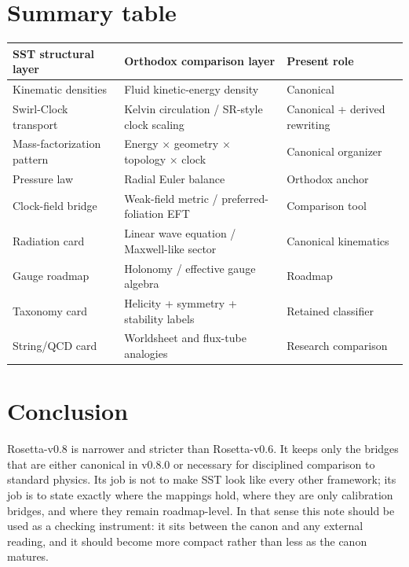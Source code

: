 \documentclass[11pt,a4paper]{article}
\begin{document}
\section{Summary table}
\begin{center}
\begin{tabular}{@{}lll@{}}
\toprule
SST structural layer & Orthodox comparison layer & Present role \\
\midrule
Kinematic densities & Fluid kinetic-energy density & Canonical \\
Swirl-Clock transport & Kelvin circulation / SR-style clock scaling & Canonical + derived rewriting \\
Mass-factorization pattern & Energy \(\times\) geometry \(\times\) topology \(\times\) clock & Canonical organizer \\
Pressure law & Radial Euler balance & Orthodox anchor \\
Clock-field bridge & Weak-field metric / preferred-foliation EFT & Comparison tool \\
Radiation card & Linear wave equation / Maxwell-like sector & Canonical kinematics \\
Gauge roadmap & Holonomy / effective gauge algebra & Roadmap \\
Taxonomy card & Helicity + symmetry + stability labels & Retained classifier \\
String/QCD card & Worldsheet and flux-tube analogies & Research comparison \\
\bottomrule
\end{tabular}
\end{center}

\section*{Conclusion}
Rosetta-v0.8 is narrower and stricter than Rosetta-v0.6. It keeps only the bridges that are either canonical in v0.8.0 or necessary for disciplined comparison to standard physics. Its job is not to make SST look like every other framework; its job is to state exactly where the mappings hold, where they are only calibration bridges, and where they remain roadmap-level. In that sense this note should be used as a checking instrument: it sits between the canon and any external reading, and it should become more compact rather than less as the canon matures.
\end{document}
